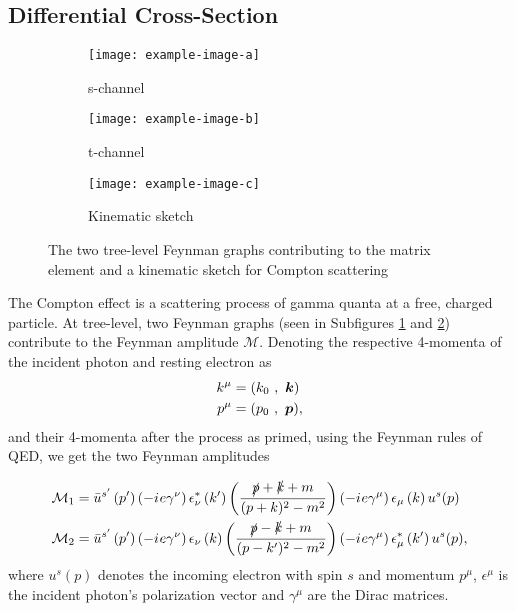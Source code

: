 \subsection{Differential Cross-Section}
\begin{figure}
	\centering
	\begin{subfigure}{0.49\textwidth}
		\centering
		\texttt{[image: example-image-a]}
		\caption{s-channel}
		\label{fig:schannel}
	\end{subfigure}
	\begin{subfigure}{0.49\textwidth}
		\centering
		\texttt{[image: example-image-b]}
		\caption{t-channel}
		\label{fig:tchannel}
	\end{subfigure}
	\par\bigskip
	\begin{subfigure}{0.45\textwidth}
		\centering
		\texttt{[image: example-image-c]}
		\caption{Kinematic sketch}
		\label{fig:kinematics}
	\end{subfigure}
	\caption{The two tree-level Feynman graphs contributing to the matrix element and a kinematic sketch for Compton scattering}
\end{figure}

The Compton effect is a scattering process of gamma quanta at a free, charged particle. At tree-level, two Feynman graphs (seen in Subfigures \ref{fig:schannel} and \ref{fig:tchannel}) contribute to the Feynman amplitude $\mathcal{M}$.
Denoting the respective 4-momenta of the incident photon and resting electron as
\begin{align*}
	k^\mu &= (k_0\ ,\ \boldsymbol{k}) \\
	p^\mu &= (p_0\ ,\ \boldsymbol{p}),
\end{align*}
and their 4-momenta after the process as primed, using the Feynman rules of QED, we get the two Feynman amplitudes

\begin{align*}
	\mathcal{M}_1 &= \bar{u}^{s'}\left(p'\right)\left(-{i\mkern1mu} e\gamma^\nu\right)\epsilon^{*}_\nu\left(k'\right)\left(\frac{\slashed{p}+\slashed{k}+m}{(p+k)^2-m^2}\right)\left(-{i\mkern1mu} e\gamma^\mu\right)\epsilon_\mu\left(k\right)u^s(p)\\
	\mathcal{M}_2 &= \bar{u}^{s'}\left(p'\right)\left(-{i\mkern1mu} e\gamma^\nu\right)\epsilon_\nu\left(k\right)\left(\frac{\slashed{p}-\slashed{k}+m}{(p-k')^2-m^2}\right)\left(-{i\mkern1mu} e\gamma^\mu\right)\epsilon^{*}_\mu\left(k'\right)u^s(p),
\end{align*}
where $u^s(p)$ denotes the incoming electron with spin $s$ and momentum $p^\mu$, $\epsilon^\mu$ is the incident photon's polarization vector and $\gamma^\mu$ are the Dirac matrices.

